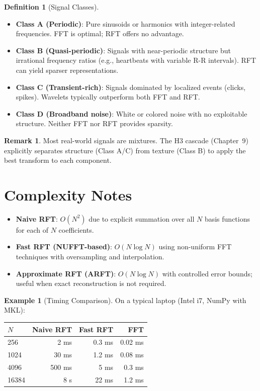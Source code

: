 \documentclass[11pt, a4paper, openany]{book}
\theoremstyle{definition}
\newtheorem{definition}{Definition}[chapter]
\newtheorem{example}{Example}[chapter]
\newtheorem{remark}{Remark}[chapter]
\begin{document}
\begin{definition}[Signal Classes]
\begin{itemize}
    \item \textbf{Class A (Periodic)}: Pure sinusoids or harmonics with integer-related frequencies. FFT is optimal; RFT offers no advantage.
    \item \textbf{Class B (Quasi-periodic)}: Signals with near-periodic structure but irrational frequency ratios (e.g., heartbeats with variable R-R intervals). RFT can yield sparser representations.
    \item \textbf{Class C (Transient-rich)}: Signals dominated by localized events (clicks, spikes). Wavelets typically outperform both FFT and RFT.
    \item \textbf{Class D (Broadband noise)}: White or colored noise with no exploitable structure. Neither FFT nor RFT provides sparsity.
\end{itemize}
\end{definition}

\begin{remark}
Most real-world signals are mixtures. The H3 cascade (Chapter~9) explicitly separates structure (Class A/C) from texture (Class B) to apply the best transform to each component.
\end{remark}

\section{Complexity Notes}
\begin{itemize}
    \item \textbf{Naive RFT}: $O(N^2)$ due to explicit summation over all $N$ basis functions for each of $N$ coefficients.
    \item \textbf{Fast RFT (NUFFT-based)}: $O(N \log N)$ using non-uniform FFT techniques with oversampling and interpolation.
    \item \textbf{Approximate RFT (ARFT)}: $O(N \log N)$ with controlled error bounds; useful when exact reconstruction is not required.
\end{itemize}

\begin{example}[Timing Comparison]
On a typical laptop (Intel i7, NumPy with MKL):
\begin{center}
\begin{tabular}{@{}lrrr@{}}\toprule
$N$ & Naive RFT & Fast RFT & FFT \\ \midrule
256 & 2 ms & 0.3 ms & 0.02 ms \\
1024 & 30 ms & 1.2 ms & 0.08 ms \\
4096 & 500 ms & 5 ms & 0.3 ms \\
16384 & 8 s & 22 ms & 1.2 ms \\ \bottomrule
\end{tabular}
\end{center}
\end{example}
\end{document}
